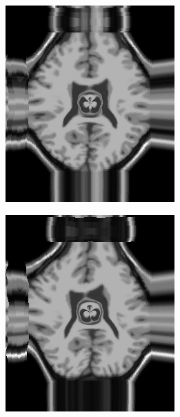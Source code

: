 \begin{figure}[h]
\begin{subfigure}[t]{0.25\textwidth}
	  \includegraphics[width=\textwidth]{figuras/resultDist.png}
	  \label{fig:dist-image-tps}
	\end{subfigure}
	\begin{subfigure}[t]{0.25\textwidth}
	  \includegraphics[width=\textwidth]{figuras/resultDistSin.png}

\end{subfigure}
\end{figure}
